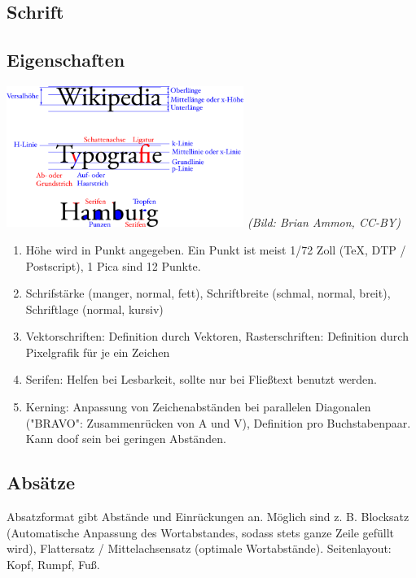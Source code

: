 \documentclass[12pt,landscape]{article}
\begin{document}
\begin{multicols}{3}
\subsection{Schrift}
\subsection{Eigenschaften}
\begin{center}
\includegraphics[height=130pt]{typografie.png}
\textit{(Bild: Brian Ammon, CC-BY)}
\end{center}
\begin{enumerate}
\item Höhe wird in Punkt angegeben. Ein Punkt ist meist 1/72 Zoll (TeX, DTP / Postscript), 1 Pica sind 12 Punkte.
\item Schrifstärke (manger, normal, fett), Schriftbreite (schmal, normal, breit), Schriftlage (normal, kursiv)
\item Vektorschriften: Definition durch Vektoren, Rasterschriften: Definition durch Pixelgrafik für je ein Zeichen
\item Serifen: Helfen bei Lesbarkeit, sollte nur bei Fließtext benutzt werden.
\item Kerning: Anpassung von Zeichenabständen bei parallelen Diagonalen ("BRAVO": Zusammenrücken von A und V), Definition pro Buchstabenpaar. Kann doof sein bei geringen Abständen. 
\end{enumerate}
\subsection{Absätze}
Absatzformat gibt Abstände und Einrückungen an. Möglich sind z. B. Blocksatz (Automatische Anpassung des Wortabstandes, sodass stets ganze Zeile gefüllt wird), Flattersatz / Mittelachsensatz (optimale Wortabstände). Seitenlayout: Kopf, Rumpf, Fuß. 

\end{multicols}
\end{document}

